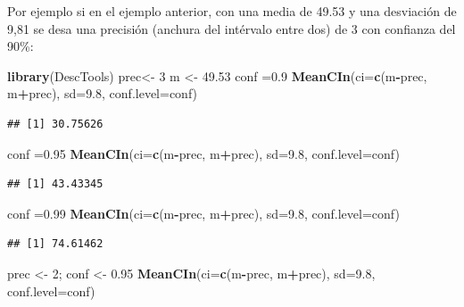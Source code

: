 \documentclass[
]{article}
\newenvironment{Shaded}{\begin{snugshade}}{\end{snugshade}}
\newcommand{\AttributeTok}[1]{\textcolor[rgb]{0.13,0.29,0.53}{#1}}
\newcommand{\DecValTok}[1]{\textcolor[rgb]{0.00,0.00,0.81}{#1}}
\newcommand{\FloatTok}[1]{\textcolor[rgb]{0.00,0.00,0.81}{#1}}
\newcommand{\FunctionTok}[1]{\textcolor[rgb]{0.13,0.29,0.53}{\textbf{#1}}}
\newcommand{\NormalTok}[1]{#1}
\newcommand{\OtherTok}[1]{\textcolor[rgb]{0.56,0.35,0.01}{#1}}
\newcommand{\SpecialCharTok}[1]{\textcolor[rgb]{0.81,0.36,0.00}{\textbf{#1}}}
\begin{document}
Por ejemplo si en el ejemplo anterior, con una media de 49.53 y una desviación de 9,81 se desa una precisión (anchura del intérvalo entre dos) de 3 con confianza del 90\%:

\begin{Shaded}
\begin{Highlighting}[]
\FunctionTok{library}\NormalTok{(DescTools)}
\NormalTok{prec}\OtherTok{\textless{}{-}} \DecValTok{3}
\NormalTok{m }\OtherTok{\textless{}{-}} \FloatTok{49.53}
\NormalTok{conf }\OtherTok{=}\FloatTok{0.9}
\FunctionTok{MeanCIn}\NormalTok{(}\AttributeTok{ci=}\FunctionTok{c}\NormalTok{(m}\SpecialCharTok{{-}}\NormalTok{prec, m}\SpecialCharTok{+}\NormalTok{prec), }\AttributeTok{sd=}\FloatTok{9.8}\NormalTok{, }\AttributeTok{conf.level=}\NormalTok{conf) }
\end{Highlighting}
\end{Shaded}

\begin{verbatim}
## [1] 30.75626
\end{verbatim}

\begin{Shaded}
\begin{Highlighting}[]
\NormalTok{conf }\OtherTok{=}\FloatTok{0.95}
\FunctionTok{MeanCIn}\NormalTok{(}\AttributeTok{ci=}\FunctionTok{c}\NormalTok{(m}\SpecialCharTok{{-}}\NormalTok{prec, m}\SpecialCharTok{+}\NormalTok{prec), }\AttributeTok{sd=}\FloatTok{9.8}\NormalTok{, }\AttributeTok{conf.level=}\NormalTok{conf) }
\end{Highlighting}
\end{Shaded}

\begin{verbatim}
## [1] 43.43345
\end{verbatim}

\begin{Shaded}
\begin{Highlighting}[]
\NormalTok{conf }\OtherTok{=}\FloatTok{0.99}
\FunctionTok{MeanCIn}\NormalTok{(}\AttributeTok{ci=}\FunctionTok{c}\NormalTok{(m}\SpecialCharTok{{-}}\NormalTok{prec, m}\SpecialCharTok{+}\NormalTok{prec), }\AttributeTok{sd=}\FloatTok{9.8}\NormalTok{, }\AttributeTok{conf.level=}\NormalTok{conf) }
\end{Highlighting}
\end{Shaded}

\begin{verbatim}
## [1] 74.61462
\end{verbatim}

\begin{Shaded}
\begin{Highlighting}[]
\NormalTok{prec }\OtherTok{\textless{}{-}} \DecValTok{2}\NormalTok{; conf }\OtherTok{\textless{}{-}} \FloatTok{0.95}
\FunctionTok{MeanCIn}\NormalTok{(}\AttributeTok{ci=}\FunctionTok{c}\NormalTok{(m}\SpecialCharTok{{-}}\NormalTok{prec, m}\SpecialCharTok{+}\NormalTok{prec), }\AttributeTok{sd=}\FloatTok{9.8}\NormalTok{, }\AttributeTok{conf.level=}\NormalTok{conf) }
\end{Highlighting}
\end{Shaded}
\end{document}
